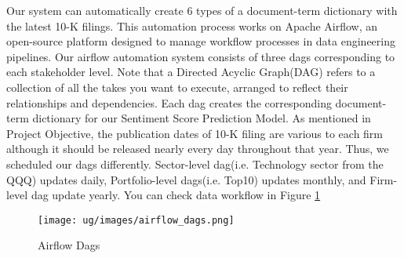 \documentclass[logo,bsc,singlespacing,parskip]{infthesis}
\begin{document}
Our system can automatically create 6 types of a document-term dictionary with the latest 10-K filings. This automation process works on Apache Airflow, an open-source platform designed to manage workflow processes in data engineering pipelines. Our airflow automation system consists of three dags corresponding to each stakeholder level. Note that a Directed Acyclic Graph(DAG) refers to a collection of all the takes you want to execute, arranged to reflect their relationships and dependencies. Each dag creates the corresponding document-term dictionary for our Sentiment Score Prediction Model. As mentioned in Project Objective, the publication dates of 10-K filing are various to each firm although it should be released nearly every day throughout that year. Thus, we scheduled our dags differently. Sector-level dag(i.e. Technology sector from the QQQ) updates daily, Portfolio-level dags(i.e. Top10) updates monthly, and Firm-level dag update yearly. You can check data workflow in Figure \ref{fig:airflow_dags}

\begin{figure}
    \centering
    \texttt{[image: ug/images/airflow\_dags.png]}
    \caption{Airflow Dags}
    \label{fig:airflow_dags}
\end{figure}
\end{document}
